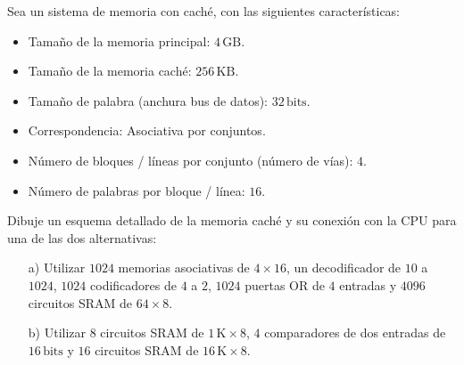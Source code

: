 \begin{ejercicio}
    Sea un sistema de memoria con caché, con las siguientes características:
    \begin{itemize}
        \item Tamaño de la memoria principal: \(4 \, \text{GB}\).
        \item Tamaño de la memoria caché: \(256 \, \text{KB}\).
        \item Tamaño de palabra (anchura bus de datos): \(32 \, \text{bits}\).
        \item Correspondencia: Asociativa por conjuntos.
        \item Número de bloques / líneas por conjunto (número de vías): \(4\).
        \item Número de palabras por bloque / línea: \(16\).
    \end{itemize}
    Dibuje un esquema detallado de la memoria caché y su conexión con la CPU para una de las dos alternativas:
    \begin{itemize}
        \item[a)] Utilizar \(1024\) memorias asociativas de \(4 \times 16\), un decodificador de \(10\) a \(1024\), \(1024\) codificadores de \(4\) a \(2\), \(1024\) puertas OR de \(4\) entradas y \(4096\) circuitos SRAM de \(64 \times 8\).
        \item[b)] Utilizar \(8\) circuitos SRAM de \(1 \, \text{K} \times 8\), \(4\) comparadores de dos entradas de \(16 \, \text{bits}\) y \(16\) circuitos SRAM de \(16 \, \text{K} \times 8\).
    \end{itemize}
\end{ejercicio}

